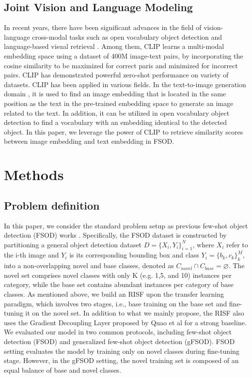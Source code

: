 \documentclass{article}
\begin{document}
\subsection{Joint Vision and Language Modeling}
In recent years, there have been significant advances in the field of vision-language cross-modal tasks such as open vocabulary object detection \cite{openvocab, vild, regionclip} and language-based visual retrieval \cite{videoclip,imageret}. 
Among them, CLIP \cite{clip} learns a multi-modal embedding space using a dataset of 400M image-text pairs, by incorporating the cosine similarity to be maximized for correct paris and minimized for incorrect pairs.
CLIP has demonstrated powerful zero-shot performance on variety of datasets.
CLIP has been applied in various fields. In the text-to-image generation domain \cite{styleclip, dalle}, it is used to find an image embedding that is located in the same position as the text in the pre-trained embedding space to generate an image related to the text. In addition, it can be utilized in open vocabulary object detection \cite{regionclip} to find a vocabulary with an embedding identical to the detected object.
In this paper, we leverage the power of CLIP to retrieve similarity scores between image embedding and text embedding in FSOD.

\section{Methods}

\subsection{Problem definition}
In this paper, we consider the standard problem setup as previous few-shot object detection (FSOD) works \cite{tfa, defrcn, dcf}.
Specifically, the FSOD dataset is constructed by partitioning a general object detection dataset ${D} = \{ {X}_i, {Y}_i\}^{N}_{i=1}$, where $X_i$ refer to the i-th image and $Y_i$ is its corresponding bounding box and class ${Y}_i=\{b_k,c_k\}_k^M$, into a non-overlapping novel and base classes, denoted as $C_{novel} \cap C_{base} = \varnothing$.
The novel set comprises novel classes with only K (e.g. 1,5, and 10) instances per category, while the base set contains abundant instances per category of base classes.
As mentioned above, we build an RISF upon the transfer learning paradigm, which involves two stages, i.e., base training on the base set and fine-tuning it on the novel set. 
In addition to what we mainly propose, the RISF also uses the Gradient Decoupling Layer proposed by Quao et al \cite{defrcn} for a strong baseline.
We evaluated our model in two common protocols, including few-shot object detection (FSOD) and generalized few-shot object detection (gFSOD). 
FSOD setting evaluates the model by training only on novel classes during fine-tuning stage.
However, in the gFSOD setting, the novel training set is composed of an equal balance of base and novel classes.
\end{document}
